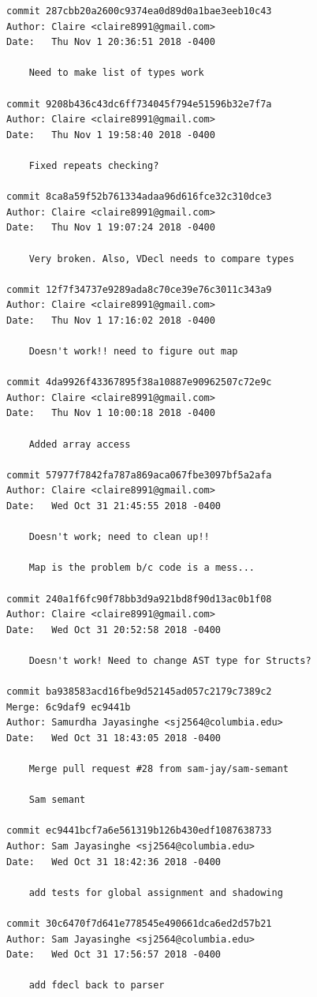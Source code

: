 \documentclass[12pt]{article}
\begin{document}
\begin{lstlisting}
commit 287cbb20a2600c9374ea0d89d0a1bae3eeb10c43
Author: Claire <claire8991@gmail.com>
Date:   Thu Nov 1 20:36:51 2018 -0400

    Need to make list of types work

commit 9208b436c43dc6ff734045f794e51596b32e7f7a
Author: Claire <claire8991@gmail.com>
Date:   Thu Nov 1 19:58:40 2018 -0400

    Fixed repeats checking?

commit 8ca8a59f52b761334adaa96d616fce32c310dce3
Author: Claire <claire8991@gmail.com>
Date:   Thu Nov 1 19:07:24 2018 -0400

    Very broken. Also, VDecl needs to compare types

commit 12f7f34737e9289ada8c70ce39e76c3011c343a9
Author: Claire <claire8991@gmail.com>
Date:   Thu Nov 1 17:16:02 2018 -0400

    Doesn't work!! need to figure out map

commit 4da9926f43367895f38a10887e90962507c72e9c
Author: Claire <claire8991@gmail.com>
Date:   Thu Nov 1 10:00:18 2018 -0400

    Added array access

commit 57977f7842fa787a869aca067fbe3097bf5a2afa
Author: Claire <claire8991@gmail.com>
Date:   Wed Oct 31 21:45:55 2018 -0400

    Doesn't work; need to clean up!!
    
    Map is the problem b/c code is a mess...

commit 240a1f6fc90f78bb3d9a921bd8f90d13ac0b1f08
Author: Claire <claire8991@gmail.com>
Date:   Wed Oct 31 20:52:58 2018 -0400

    Doesn't work! Need to change AST type for Structs?

commit ba938583acd16fbe9d52145ad057c2179c7389c2
Merge: 6c9daf9 ec9441b
Author: Samurdha Jayasinghe <sj2564@columbia.edu>
Date:   Wed Oct 31 18:43:05 2018 -0400

    Merge pull request #28 from sam-jay/sam-semant
    
    Sam semant

commit ec9441bcf7a6e561319b126b430edf1087638733
Author: Sam Jayasinghe <sj2564@columbia.edu>
Date:   Wed Oct 31 18:42:36 2018 -0400

    add tests for global assignment and shadowing

commit 30c6470f7d641e778545e490661dca6ed2d57b21
Author: Sam Jayasinghe <sj2564@columbia.edu>
Date:   Wed Oct 31 17:56:57 2018 -0400

    add fdecl back to parser


\end{lstlisting}
\end{document}
